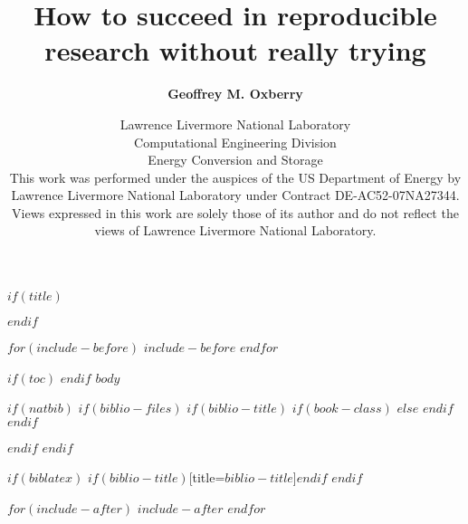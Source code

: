 \documentclass[12pt,handout,ignorenonframetext]{beamer}
\title[Reproducibility without trying]
{How to succeed in reproducible research without really trying}
\subtitle[G. Oxberry]
{\textbf{Geoffrey M. Oxberry}}
\author[]{\small{Lawrence Livermore National Laboratory \\
Computational Engineering Division \\
Energy Conversion and Storage} \\[2\baselineskip] 
\scriptsize{This work was performed under the auspices of the 
US Department of Energy by Lawrence Livermore National Laboratory
 under Contract DE-AC52-07NA27344. Views expressed in this work
are solely those of its author and do not reflect the views of Lawrence
Livermore National Laboratory.}}
\institute[LLNL-PRES-621574-DRAFT]
\begin{document}
$if(title)$
\maketitle
$endif$ %

$for(include-before)$
$include-before$
$endfor$ %

$if(toc)$
{
\hypersetup{linkcolor=black}
\setcounter{tocdepth}{$toc-depth$}
\tableofcontents
}
$endif$ %
$body$

$if(natbib)$
$if(biblio-files)$
$if(biblio-title)$
$if(book-class)$
\renewcommand\bibname{$biblio-title$}
$else$
\renewcommand\refname{$biblio-title$}
$endif$ %
$endif$ %

$endif$ %
$endif$ %

$if(biblatex)$
\printbibliography$if(biblio-title)$[title=$biblio-title$]$endif$
$endif$ %

$for(include-after)$
$include-after$
$endfor$ %
\end{document}
